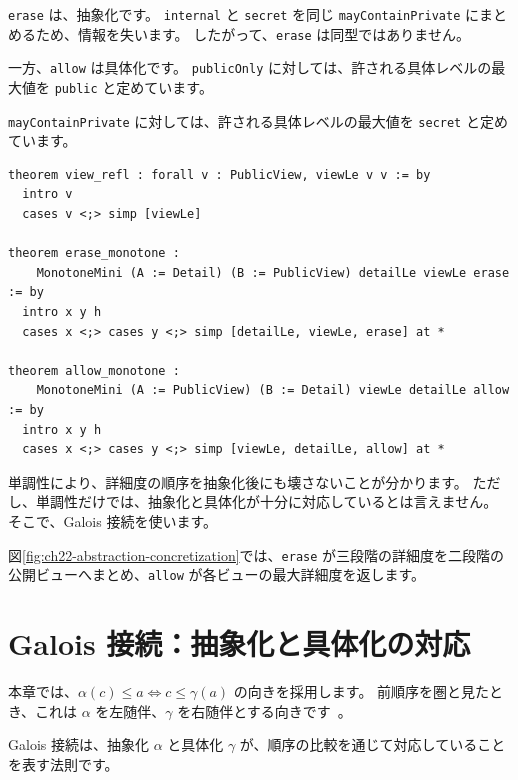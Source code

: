 \texttt{erase} は、抽象化です。
\texttt{internal} と \texttt{secret} を同じ \texttt{mayContainPrivate} にまとめるため、情報を失います。
したがって、\texttt{erase} は同型ではありません。

一方、\texttt{allow} は具体化です。
\texttt{publicOnly} に対しては、許される具体レベルの最大値を \texttt{public} と定めています。

\texttt{mayContainPrivate} に対しては、許される具体レベルの最大値を \texttt{secret} と定めています。

\begin{listing}[htbp]
\begin{verbatim}
theorem view_refl : forall v : PublicView, viewLe v v := by
  intro v
  cases v <;> simp [viewLe]

theorem erase_monotone :
    MonotoneMini (A := Detail) (B := PublicView) detailLe viewLe erase := by
  intro x y h
  cases x <;> cases y <;> simp [detailLe, viewLe, erase] at *

theorem allow_monotone :
    MonotoneMini (A := PublicView) (B := Detail) viewLe detailLe allow := by
  intro x y h
  cases x <;> cases y <;> simp [viewLe, detailLe, allow] at *
\end{verbatim}
\caption{\texttt{erase\_monotone} と \texttt{allow\_monotone}}
\label{lst:ch22-erase-monotone}
\end{listing}

単調性により、詳細度の順序を抽象化後にも壊さないことが分かります。
ただし、単調性だけでは、抽象化と具体化が十分に対応しているとは言えません。
そこで、Galois 接続を使います。

図\ref{fig:ch22-abstraction-concretization}では、\texttt{erase} が三段階の詳細度を二段階の公開ビューへまとめ、\texttt{allow} が各ビューの最大詳細度を返します。


\section{Galois 接続：抽象化と具体化の対応}

本章では、\(\alpha(c) \leq a \Longleftrightarrow c \leq \gamma(a)\) の向きを採用します。
前順序を圏と見たとき、これは \(\alpha\) を左随伴、\(\gamma\) を右随伴とする向きです~\cite{riehl-category-theory-in-context}。

Galois 接続は、抽象化 \(\alpha\) と具体化 \(\gamma\) が、順序の比較を通じて対応していることを表す法則です。

